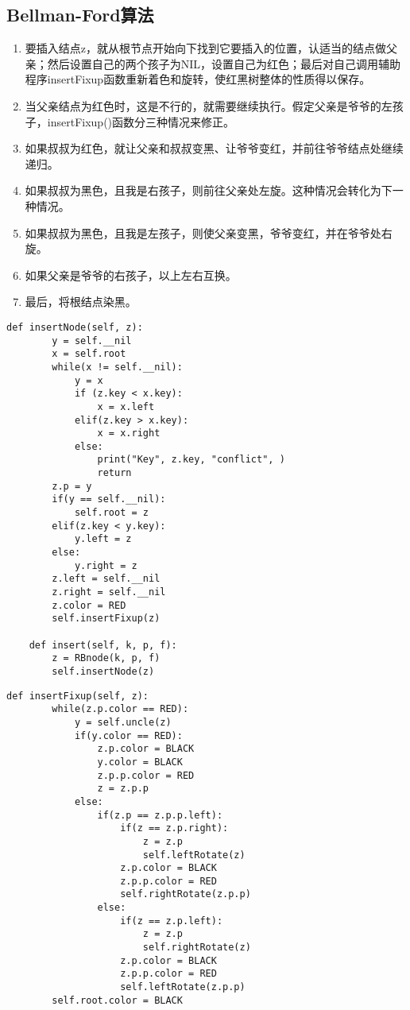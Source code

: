 \documentclass[12pt,letterpaper]{article}
\begin{document}
\subsection{Bellman-Ford算法}
\begin{enumerate}
	\item 要插入结点z，就从根节点开始向下找到它要插入的位置，认适当的结点做父亲；然后设置自己的两个孩子为NIL，设置自己为红色；最后对自己调用辅助程序insertFixup函数重新着色和旋转，使红黑树整体的性质得以保存。
	\item 当父亲结点为红色时，这是不行的，就需要继续执行。假定父亲是爷爷的左孩子，insertFixup()函数分三种情况来修正。
	\item 如果叔叔为红色，就让父亲和叔叔变黑、让爷爷变红，并前往爷爷结点处继续递归。
	\item 如果叔叔为黑色，且我是右孩子，则前往父亲处左旋。这种情况会转化为下一种情况。
	\item 如果叔叔为黑色，且我是左孩子，则使父亲变黑，爷爷变红，并在爷爷处右旋。
	\item 如果父亲是爷爷的右孩子，以上左右互换。
	\item 最后，将根结点染黑。
\end{enumerate}
\begin{lstlisting}[style = Python]
    def insertNode(self, z):
        y = self.__nil
        x = self.root
        while(x != self.__nil):
            y = x
            if (z.key < x.key):
                x = x.left
            elif(z.key > x.key):
                x = x.right
            else:
                print("Key", z.key, "conflict", )
                return
        z.p = y
        if(y == self.__nil):
            self.root = z
        elif(z.key < y.key):
            y.left = z
        else:
            y.right = z
        z.left = self.__nil
        z.right = self.__nil
        z.color = RED
        self.insertFixup(z)

    def insert(self, k, p, f):
        z = RBnode(k, p, f)
        self.insertNode(z)    
\end{lstlisting}

\begin{lstlisting}[style = Python]
    def insertFixup(self, z):
        while(z.p.color == RED):
            y = self.uncle(z)
            if(y.color == RED):
                z.p.color = BLACK
                y.color = BLACK
                z.p.p.color = RED
                z = z.p.p
            else:
                if(z.p == z.p.p.left):
                    if(z == z.p.right):
                        z = z.p
                        self.leftRotate(z)
                    z.p.color = BLACK
                    z.p.p.color = RED
                    self.rightRotate(z.p.p)
                else:
                    if(z == z.p.left):
                        z = z.p
                        self.rightRotate(z)
                    z.p.color = BLACK
                    z.p.p.color = RED
                    self.leftRotate(z.p.p)
        self.root.color = BLACK
\end{lstlisting}
\end{document}
